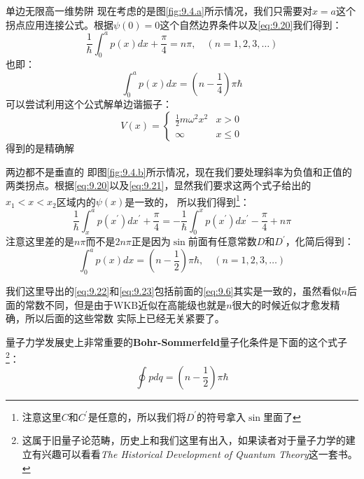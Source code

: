 \documentclass[a4paper,zihao=-4,linespread=1]{ctexrep}
\begin{document}
    \begin{example}{单边无限高一维势阱}
        现在考虑的是图\ref{fig:9.4.a}所示情况，我们只需要对$x=a$这个拐点应用连接公式。根据$\psi(0)=0$这个自然边界条件以及\ref{eq:9.20}我们得到：
        \[\frac{1}{\hbar} \int_{0}^{a} p(x) d x+\frac{\pi}{4}=n \pi, \quad(n=1,2,3, \ldots)\]
        也即：
        \begin{equation}
            \label{eq:9.22}
            \boxed{
                \int_{0}^{a} p(x) d x=\left(n-\frac{1}{4}\right) \pi \hbar
            }
        \end{equation}
        可以尝试利用这个公式解单边谐振子：
        \begin{equation*}
            V(x)=\begin{cases}
                \frac{1}{2}m\omega^2x^2&x>0\\
                \infty & x\leq 0
            \end{cases}
        \end{equation*}
        得到的是精确解
    \end{example}
    \begin{example}{两边都不是垂直的}
        即图\ref{fig:9.4.b}所示情况，现在我们要处理斜率为负值和正值的两类拐点。根据\ref{eq:9.20}以及\ref{eq:9.21}，显然我们要求这两个式子给出的$x_1<x<x_2$区域内的$\psi(x)$是一致的，
        所以我们得到\footnote{注意这里$C$和$C^\prime$是任意的，所以我们将$D^\prime$的符号拿入$\sin$里面了}：
        \[\frac{1}{\hbar} \int_{x}^{a} p\left(x^{\prime}\right) d x^{\prime}+\frac{\pi}{4}=-\frac{1}{\hbar} \int_{0}^{x} p\left(x^{\prime}\right) d x^{\prime}-\frac{\pi}{4}+n\pi\]
        注意这里差的是$n\pi$而不是$2n\pi$正是因为$\sin$前面有任意常数$D$和$D^\prime$，化简后得到：
        \begin{equation}
            \label{eq:9.23}
            \boxed{
                \int_{0}^{a}p(x)dx=(n-\frac{1}{2})\pi\hbar,\quad(n=1,2,3,\ldots)
            }
        \end{equation}
    \end{example}
    
    我们这里导出的\ref{eq:9.22}和\ref{eq:9.23}包括前面的\ref{eq:9.6}其实是一致的，虽然看似$n$后面的常数不同，但是由于WKB近似在高能级也就是$n$很大的时候近似才愈发精确，所以后面的这些常数
    实际上已经无关紧要了。

    量子力学发展史上非常重要的\textbf{Bohr-Sommerfeld}量子化条件是下面的这个式子\footnote{这属于旧量子论范畴，历史上和我们这里有出入，如果读者对于量子力学的建立有兴趣可以看看{\itshape The Historical Development of Quantum Theory}这一套书。}：
    \begin{equation}
        \oint pdq=\left(n-\frac{1}{2}\right)\pi\hbar
    \end{equation}
    
\end{document}
